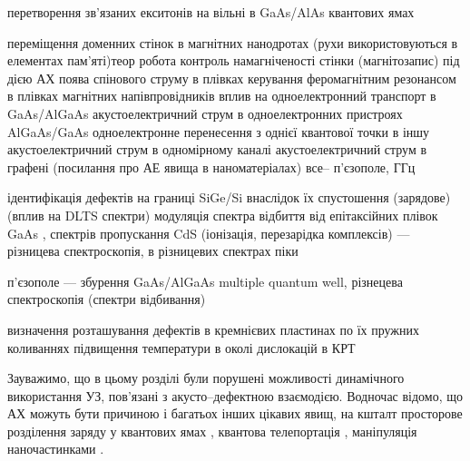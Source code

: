 перетворення зв'язаних екситонів на вільні в GaAs/AlAs квантових ямах \cite{PhysRevB80:165307}

переміщення доменних стінок в магнітних нанодротах (рухи використовуються в елементах пам'яті)теор робота\cite{US:nanowire}
контроль намагніченості стінки (магнітозапис) під дією АХ \cite{LI2014}
поява спінового струму в плівках \cite{PhysRevLett108:176601}
керування феромагнітним резонансом в плівках магнітних напівпровідників \cite{PhysRevB90:094401}
вплив на одноелектронний транспорт в GaAs/AlGaAs\cite{US:single}
акустоелектричний струм в одноелектронних пристроях AlGaAs/GaAs \cite{US:single2}
одноелектронне перенесення з однієї квантової точки в іншу \cite{US:Nature}
акустоелектричний струм в одномірному каналі\cite{US:1D,NETO2016}
акустоелектричний струм в графені (посилання про АЕ явища в наноматеріалах) \cite{US:graphen}
все-- п'єзополе, ГГц





ідентифікація дефектів на границі SiGe/Si внаслідок їх спустошення (зарядове) (вплив на DLTS спектри) \cite{KorotchFTP1996}
модуляція спектра відбиття від епітаксійних плівок GaAs \cite{KorotFTP1994,OSTROVSKII2000,Ostrovskii2001}, спектрів пропускання CdS \cite{KorotFTT93} (іонізація, перезарідка комплексів) --- різницева спектроскопія, в різницевих спектрах піки

п'єзополе --- збурення GaAs/AlGaAs multiple quantum well, різнецева спектроскопія (спектри відбивання)  \cite{SST:USmethod}

визначення розташування дефектів в кремнієвих пластинах по їх пружних коливаннях \cite{BELYAEV2001}
підвищення температури в околі дислокацій в КРТ \cite{savkina2004disl,SAVKINA2005disl}







Зауважимо, що в цьому розділі були порушені можливості динамічного використання УЗ, пов'язані з акусто--дефектною взаємодією.
Водночас відомо, що АХ можуть бути причиною і багатьох інших цікавих явищ, на кшталт просторове розділення заряду у квантових ямах \cite{Kuryliuk2009}, квантова телепортація \cite{Buscemi}, маніпуляція наночастинками \cite{Cuberes,Olikh:SPQEO2010}.

